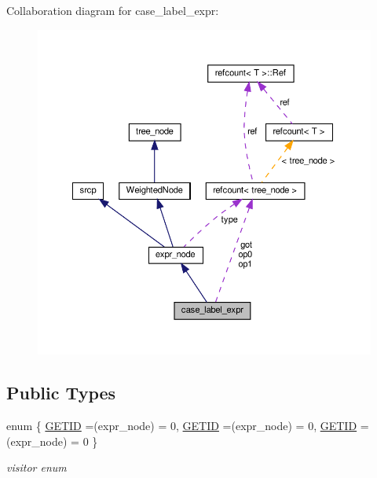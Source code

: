 Collaboration diagram for case\+\_\+label\+\_\+expr\+:
\nopagebreak
\begin{figure}[H]
\begin{center}
\leavevmode
\includegraphics[width=350pt]{d8/da3/structcase__label__expr__coll__graph}
\end{center}
\end{figure}
\subsection*{Public Types}
\begin{DoxyCompactItemize}
\item 
enum \{ \hyperlink{structcase__label__expr_a159bd29456c8ff7c394bfa8ed53b98e7a487f1b4372e7b458ae23e55b72e77beb}{G\+E\+T\+ID} =(expr\+\_\+node) = 0, 
\hyperlink{structcase__label__expr_a159bd29456c8ff7c394bfa8ed53b98e7a487f1b4372e7b458ae23e55b72e77beb}{G\+E\+T\+ID} =(expr\+\_\+node) = 0, 
\hyperlink{structcase__label__expr_a159bd29456c8ff7c394bfa8ed53b98e7a487f1b4372e7b458ae23e55b72e77beb}{G\+E\+T\+ID} =(expr\+\_\+node) = 0
 \}\begin{DoxyCompactList}\small\item\em visitor enum \end{DoxyCompactList}
\end{DoxyCompactItemize}
